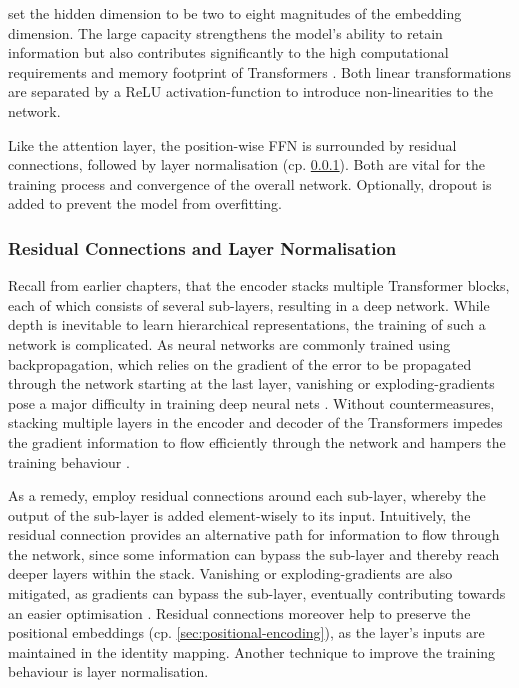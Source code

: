 \textcite[][9]{vaswaniAttentionAllYou2017} set the hidden dimension to be two to eight magnitudes of the embedding dimension. The large capacity strengthens the model's ability to retain information but also contributes significantly to the high computational requirements and memory footprint of Transformers \autocites[][5]{tayEfficientTransformersSurvey2022}[][1]{kitaevReformerEfficientTransformer2020}. Both linear transformations are separated by a \gls{ReLU} \gls{activation-function} \autocite[][318]{glorotDeepSparseRectifier2011} to introduce non-linearities to the network.

Like the attention layer, the position-wise \gls{FFN} is surrounded by residual connections, followed by layer normalisation (cp. \cref{sec:residual-connections-layer-norm}). Both are vital for the training process and convergence of the overall network. Optionally, dropout \autocite[][1930]{srivastavaDropoutSimpleWay} is added to prevent the model from \gls{overfitting}.

\subsubsection{Residual Connections and Layer Normalisation}\label{sec:residual-connections-layer-norm}

Recall from earlier chapters, that the encoder stacks multiple Transformer blocks, each of which consists of several sub-layers, resulting in a deep network. While depth is inevitable to learn hierarchical representations, the training of such a network is complicated. As neural networks are commonly trained using backpropagation, which relies on the gradient of the error to be propagated through the network starting at the last layer, vanishing or \glspl{exploding-gradient} pose a major difficulty in training deep neural nets \autocite[][1]{heDeepResidualLearning2015}. Without countermeasures, stacking multiple layers in the encoder and decoder of the Transformers impedes the gradient information to flow efficiently through the network and hampers the training behaviour \autocite[][1811]{wangLearningDeepTransformer2019}.

As a remedy, \textcite[][3]{vaswaniAttentionAllYou2017} employ residual connections around each sub-layer, whereby the output of the sub-layer is added element-wisely to its input. Intuitively, the residual connection provides an alternative path for information to flow through the network, since some information can bypass the sub-layer and thereby reach deeper layers within the stack. Vanishing or \glspl{exploding-gradient} are also mitigated, as gradients can bypass the sub-layer, eventually contributing towards an easier optimisation \autocite[][3591]{liuRethinkingSkipConnection2020}. Residual connections moreover help to preserve the positional embeddings (cp. \cref{sec:positional-encoding}), as the layer's inputs are maintained in the identity mapping. Another technique to improve the training behaviour is layer normalisation.

